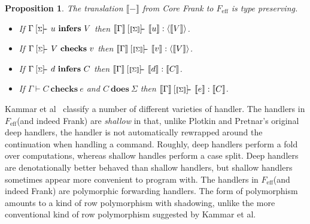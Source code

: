 \documentclass[preprint]{sigplanconf}
\makeatletter
\newcommand{\feff}{$F_\textrm{eff}$\xspace}
\newcommand{\set}[1]{\{#1\}}
\newcommand{\many}{\overline}
\newcommand{\sem}[1]{\llbracket{#1}\rrbracket}
\newcommand{\seml}{\left\llbracket}
\newcommand{\semr}{\right\rrbracket}
\newcommand{\FV}{\mathit{FV}}
\newcommand{\dom}{\mathit{dom}}
\newcommand\ba{\begin{array}}
\newcommand\ea{\end{array}}
\newcommand{\bl}{\ba{@{}c@{}}}
\newcommand{\el}{\ea}
\newcommand{\judgeword}[1]{~\mathbf{#1}~}
\newcommand{\sigentails}[1]{\mathbin{[{\text{\scriptsize ${#1}$}}]\!\text{-\!-}}\,}
\newcommand{\val}[3]  {#1 \vdash {#2} : {#3}}
\newcommand{\comp}[4]  {#1 \sigentails{#2} {#3} : {#4}}
\newcommand{\rt}[1]{\langle{#1}\rangle}   %
\newcommand{\makes}[4]  {#1 \sigentails{#2} {#3} \judgeword{infers} {#4}}
\newcommand{\has}[4] {#1 \sigentails{#2} {#3} \judgeword{checks} {#4}}
\newcommand{\can}[4]{#1 \sigentails{#2} {#3} \judgeword{infers} {#4}}
\newcommand{\does}[3]{#1 \vdash {#2} \judgeword{checks} {#3}}
\newcommand{\effs}[2]{{#1} \judgeword{does} {#2}}
\newcommand{\makesgs}{\makes{\Gamma}{\sigs}}
\newcommand{\hasgs}{\has{\Gamma}{\sigs}}
\newcommand{\cangs}{\can{\Gamma}{\sigs}}
\newcommand{\doesg}{\does{\Gamma}}
\newtheorem{proposition}[theorem]{Proposition}
\newcommand{\sigs}{\Sigma}
\newcommand{\force}[1]{{#1}!}
\makeatother
\begin{document}
%

\begin{proposition}
The translation $\sem{-}$ from Core Frank to \feff is type preserving.
\begin{itemize}
\item If $\makesgs{u}{V}$ then $\comp{\sem{\Gamma}}{\sem{\sigs}}{\sem{u}}{\rt{\sem{V}}}$.
\item If $\hasgs{V}{v}$   then $\comp{\sem{\Gamma}}{\sem{\sigs}}{\sem{v}}{\rt{\sem{V}}}$.
\item If $\cangs{d}{C}$   then $\comp{\sem{\Gamma}}{\sem{\sigs}}{\sem{d}}{\sem{C}}$.
\item If $\doesg{C}{e}$ and $\effs{C}{\sigs}$ then
  $\comp{\sem{\Gamma}}{\sem{\sigs}}{\sem{e}}{\sem{C}}$.
\end{itemize}
\end{proposition}

Kammar et al~\cite{KammarLO13} classify a number of different
varieties of handler.
%
The handlers in \feff (and indeed Frank) are \emph{shallow} in that,
unlike Plotkin and Pretnar's original deep handlers, the handler is
not automatically rewrapped around the continuation when handling a
command. Roughly, deep handlers perform a fold over computations,
whereas shallow handles perform a case split. Deep handlers are
denotationally better behaved than shallow handlers, but shallow
handlers sometimes appear more convenient to program with.
%
The handlers in \feff (and indeed Frank) are polymorphic forwarding
handlers. The form of polymorphism amounts to a kind of row
polymorphism with shadowing, unlike the more conventional kind of row
polymorphism suggested by Kammar et al.

\end{document}
